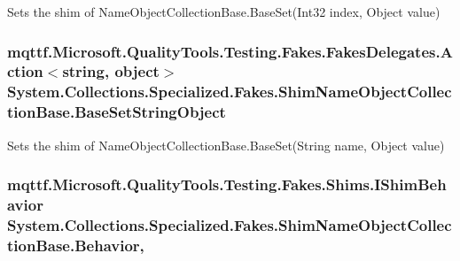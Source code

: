 Sets the shim of Name\-Object\-Collection\-Base.\-Base\-Set(\-Int32 index, Object value)

\hypertarget{class_system_1_1_collections_1_1_specialized_1_1_fakes_1_1_shim_name_object_collection_base_afb6bca2ff77a3cace44e027e0fb6bb4d}{
\subsubsection[{Base\-Set\-String\-Object}]{\setlength{\rightskip}{0pt plus 5cm}mqttf.\-Microsoft.\-Quality\-Tools.\-Testing.\-Fakes.\-Fakes\-Delegates.\-Action$<$string, object$>$ System.\-Collections.\-Specialized.\-Fakes.\-Shim\-Name\-Object\-Collection\-Base.\-Base\-Set\-String\-Object\hspace{0.3cm}{\ttfamily [set]}}}\label{class_system_1_1_collections_1_1_specialized_1_1_fakes_1_1_shim_name_object_collection_base_afb6bca2ff77a3cace44e027e0fb6bb4d}


Sets the shim of Name\-Object\-Collection\-Base.\-Base\-Set(\-String name, Object value)

\hypertarget{class_system_1_1_collections_1_1_specialized_1_1_fakes_1_1_shim_name_object_collection_base_addcae837064421835b36656f8a172728}{
\subsubsection[{Behavior}]{\setlength{\rightskip}{0pt plus 5cm}mqttf.\-Microsoft.\-Quality\-Tools.\-Testing.\-Fakes.\-Shims.\-I\-Shim\-Behavior System.\-Collections.\-Specialized.\-Fakes.\-Shim\-Name\-Object\-Collection\-Base.\-Behavior\hspace{0.3cm}{\ttfamily [static]}, {\ttfamily [set]}}}\label{class_system_1_1_collections_1_1_specialized_1_1_fakes_1_1_shim_name_object_collection_base_addcae837064421835b36656f8a172728}


